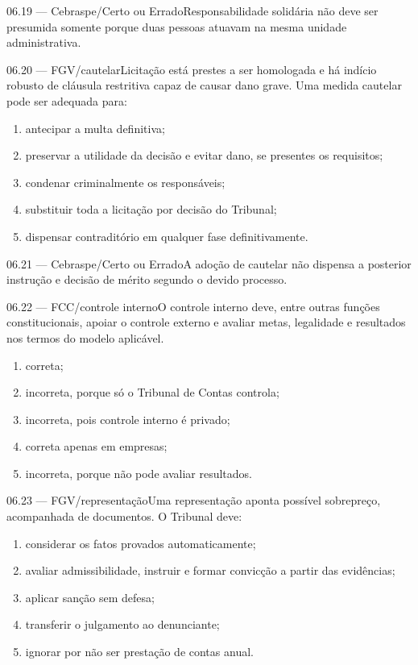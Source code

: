 \begin{questao}{ 06.19 — Cebraspe/Certo ou Errado}Responsabilidade solidária não deve ser presumida somente porque duas pessoas atuavam na mesma unidade administrativa.\end{questao}
\begin{questao}{ 06.20 — FGV/cautelar}Licitação está prestes a ser homologada e há indício robusto de cláusula restritiva capaz de causar dano grave. Uma medida cautelar pode ser adequada para:\begin{enumerate}[label=\Alph*)]\item antecipar a multa definitiva;\item preservar a utilidade da decisão e evitar dano, se presentes os requisitos;\item condenar criminalmente os responsáveis;\item substituir toda a licitação por decisão do Tribunal;\item dispensar contraditório em qualquer fase definitivamente.\end{enumerate}\end{questao}
\begin{questao}{ 06.21 — Cebraspe/Certo ou Errado}A adoção de cautelar não dispensa a posterior instrução e decisão de mérito segundo o devido processo.\end{questao}
\begin{questao}{ 06.22 — FCC/controle interno}O controle interno deve, entre outras funções constitucionais, apoiar o controle externo e avaliar metas, legalidade e resultados nos termos do modelo aplicável.\begin{enumerate}[label=\Alph*)]\item correta;\item incorreta, porque só o Tribunal de Contas controla;\item incorreta, pois controle interno é privado;\item correta apenas em empresas;\item incorreta, porque não pode avaliar resultados.\end{enumerate}\end{questao}
\begin{questao}{ 06.23 — FGV/representação}Uma representação aponta possível sobrepreço, acompanhada de documentos. O Tribunal deve:\begin{enumerate}[label=\Alph*)]\item considerar os fatos provados automaticamente;\item avaliar admissibilidade, instruir e formar convicção a partir das evidências;\item aplicar sanção sem defesa;\item transferir o julgamento ao denunciante;\item ignorar por não ser prestação de contas anual.\end{enumerate}\end{questao}
